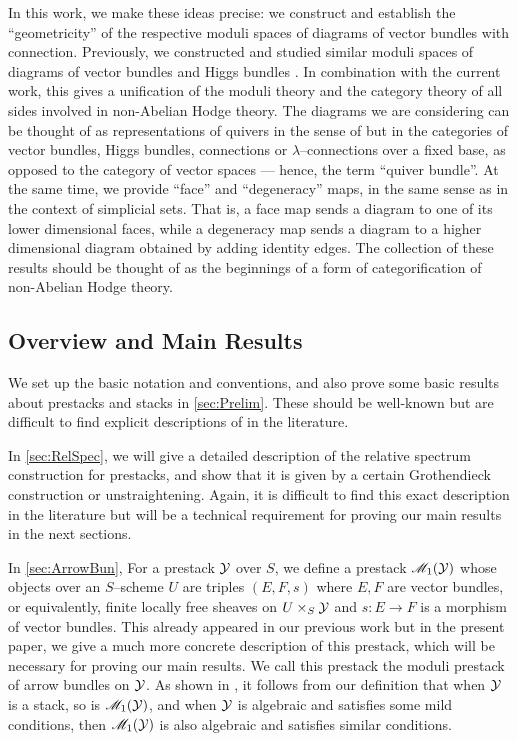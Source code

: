 \documentclass[11pt]{amsart}
\begin{document}
In this work, we make these ideas precise: we construct and establish
the ``geometricity'' of the respective moduli spaces of diagrams of vector
bundles with connection. Previously, we constructed and studied similar moduli
spaces of diagrams of vector bundles and Higgs bundles \cite{ModQuivBun}.
In combination with the current work, this gives a unification of the moduli
theory and the category theory of all sides involved in non-Abelian Hodge
theory.
The diagrams we are considering can be thought of as representations of quivers
in the sense of \cite{QuivRepKirillov} but in the categories of vector bundles,
Higgs bundles, connections or $\lambda$--connections over a fixed base,
as opposed to the category of vector spaces --- hence, the term ``quiver
bundle''.
At the same time, we provide ``face'' and ``degeneracy'' maps, in the same sense
as in the context of simplicial sets. That is, a face map sends a diagram to one
of its lower dimensional faces, while a degeneracy map sends a diagram to a
higher dimensional diagram obtained by adding identity edges. The collection
of these results should be thought of as the beginnings of a form of
categorification of non-Abelian Hodge theory.

\subsection{Overview and Main Results}

We set up the basic notation and conventions, and also prove some basic results
about prestacks and stacks in \cref{sec:Prelim}. These should be well-known but
are difficult to find explicit descriptions of in the literature.

In \cref{sec:RelSpec}, we will give a detailed description of the relative
spectrum construction for prestacks, and show that it is given by a certain
Grothendieck construction or unstraightening.  Again, it is difficult to find
this exact description in the literature but will be a technical requirement for
proving our main results in the next sections.

In \cref{sec:ArrowBun}, For a prestack $\mathcal{Y}$ over $S$, we define a prestack
$\mathscr{M}_1(\mathcal{Y})$ whose objects over an $S$--scheme $U$ are triples $(E, F, s)$
where $E, F$ are vector bundles, or equivalently, finite locally free sheaves on
$U \times_S \mathcal{Y}$ and $s : E \to F$ is a morphism of vector bundles. This
already appeared in our previous work \cite{ModQuivBun} but in the present
paper, we give a much more concrete description of this prestack, which will be
necessary for proving our main results. We call this prestack the moduli
prestack of arrow bundles on $\mathcal{Y}$. As shown in \cite{ModQuivBun}, it follows
from our definition that when $\mathcal{Y}$ is a stack, so is $\mathscr{M}_1(\mathcal{Y})$, and when
$\mathcal{Y}$ is algebraic and satisfies some mild conditions, then $\mathscr{M}_1(\mathcal{Y})$ is
also algebraic and satisfies similar conditions.
\end{document}
